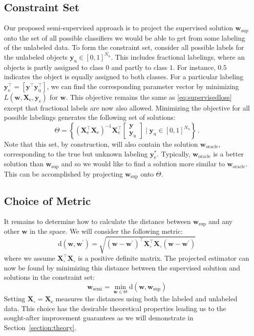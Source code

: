\documentclass[sts,preprint]{imsart-custom}
\newcommand{\Xe}{\vec{X}_\mathrm{e}  }
\newcommand{\XeT}{\vec{X}_\mathrm{e}^\top}
\newcommand{\ye}{\begin{bmatrix} \vec{y}  \\ \vec{y}_\mathrm{u} \end{bmatrix}}
\newcommand{\G}{\left(\Xe^\top \Xe \right)^{-1}}
\renewcommand{\vec}[1]{\mathbf{#1}}
\begin{document}
\subsection{Constraint Set}
Our proposed semi-supervised approach is to project the supervised solution $\vec{w}_\text{sup}$ onto the set of all possible classifiers we would be able to get from some labeling of the unlabeled data. To form the constraint set, consider all possible labels for the unlabeled objects $\vec{y}_\text{u} \in [0,1]^{N_u}$. This includes fractional labelings, where an objects is partly assigned to class $0$ and partly to class $1$. For instance, $0.5$ indicates the object is equally assigned to both classes. For a particular labeling $\vec{y}_\text{e}^\top = \left[ \vec{y}^\top \vec{y}_\text{u}^\top \right]$, we can find the corresponding parameter vector by minimizing $L(\vec{w},\vec{X}_\text{e},\vec{y}_\text{e})$ for $\vec{w}$.
This objective remains the same as \eqref{eq:supervisedloss} except that fractional labels are now also allowed. Minimizing the objective for all possible labelings generates the following set of solutions:
\begin{equation}
\label{eq:constrainedregion}
\Theta=\left\{ \G \XeT \ye \mid \vec{y}_\text{u} \in [0,1]^{N_u} \right\} \, .
\end{equation}
Note that this set, by construction, will also contain the solution $\vec{w}_\text{oracle}$, corresponding to the true but unknown labeling $\vec{y}_\text{e}^{\ast}$. Typically, $\vec{w}_\text{oracle}$ is a better solution than $\vec{w}_\text{sup}$ and so we would like to find a solution more similar to $\vec{w}_\text{oracle}$. This can be accomplished by projecting $\vec{w}_\text{sup}$ onto $\Theta$.

\subsection{Choice of Metric}
It remains to determine how to calculate the distance between $\vec{w}_\text{sup}$ and any other $\vec{w}$ in the space. We will consider the following metric:
\begin{equation}
\label{eq:metric}
\text{d}(\vec{w},\vec{w}^\prime)=\sqrt{\left( \vec{w}-\vec{w}^\prime \right)^\top \vec{X}_{\circ}^\top \vec{X}_{\circ}  \left( \vec{w}-\vec{w}^\prime \right)}
\end{equation}
where we assume $\vec{X}_{\circ}^\top \vec{X}_{\circ}$ is a positive definite matrix. The projected estimator can now be found by minimizing this distance between the supervised solution and solutions in the constraint set:
\begin{equation}
\label{eq:projection}
\vec{w}_\mathrm{semi} = \min_{\vec{w} \in \Theta} \text{d}(\vec{w},\vec{w}_\text{sup})
\end{equation}
Setting $\vec{X}_\circ=\Xe$ measures the distances using both the labeled and unlabeled data. This choice has the desirable theoretical properties leading us to the sought-after improvement guarantees as we will demonstrate in Section~\ref{section:theory}.
\end{document}
